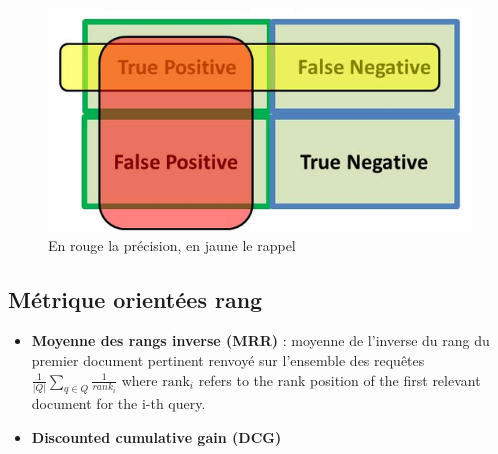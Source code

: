 \documentclass{article}
\theoremstyle{plain}%
\theoremstyle{definition}
\theoremstyle{remark}
\begin{document}
\begin{figure}[!htbp]
    \centering
    \includegraphics*[width=.5\textwidth]{precision_recall_conf_matrix.png}
    \caption{En rouge la précision, en jaune le rappel}
    \label{fig:precision_recall}
\end{figure}

\subsection{Métrique orientées rang}
\begin{itemize}
    \item \textbf{Moyenne des rangs inverse (MRR)} : moyenne de l'inverse du rang du premier document pertinent renvoyé sur l'ensemble des requêtes $ \frac{1}{\left| Q \right| } \sum_{q \in Q}^{} \frac{1}{rank_i} $ where $ \text{rank}_{i}$ refers to the rank position of the first relevant document for the i-th query.
    
    \item \textbf{Discounted cumulative gain (DCG)}
\end{itemize}
\end{document}
